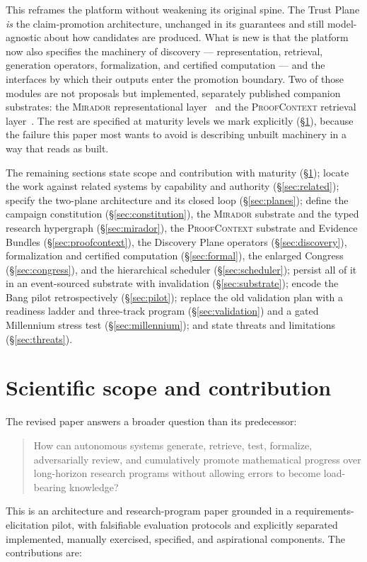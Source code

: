 \documentclass[11pt]{amsart}
\theoremstyle{definition}
\theoremstyle{remark}
\newcommand{\mirador}{\textsc{Mirador}}
\newcommand{\pc}{\textsc{ProofContext}}
\begin{document}
This reframes the platform without weakening its original spine. The Trust Plane
\emph{is} the claim-promotion architecture, unchanged in its guarantees and
still model-agnostic about how candidates are produced. What is new is that the
platform now also specifies the machinery of discovery --- representation,
retrieval, generation operators, formalization, and certified computation ---
and the interfaces by which their outputs enter the promotion boundary. Two of
those modules are not proposals but implemented, separately published companion
substrates: the \mirador{} representational layer~\cite{lucius2026mirador} and
the \pc{} retrieval layer~\cite{lucius2026proofcontext}. The rest are specified
at maturity levels we mark explicitly (\S\ref{sec:scope}), because the failure
this paper most wants to avoid is describing unbuilt machinery in a way that
reads as built.

The remaining sections state scope and contribution with maturity
(\S\ref{sec:scope}); locate the work against related systems by capability and
authority (\S\ref{sec:related}); specify the two-plane architecture and its
closed loop (\S\ref{sec:planes}); define the campaign constitution
(\S\ref{sec:constitution}), the \mirador{} substrate and the typed research
hypergraph (\S\ref{sec:mirador}), the \pc{} substrate and Evidence Bundles
(\S\ref{sec:proofcontext}), the Discovery Plane operators (\S\ref{sec:discovery}),
formalization and certified computation (\S\ref{sec:formal}), the enlarged
Congress (\S\ref{sec:congress}), and the hierarchical scheduler
(\S\ref{sec:scheduler}); persist all of it in an event-sourced substrate with
invalidation (\S\ref{sec:substrate}); encode the Bang pilot retrospectively
(\S\ref{sec:pilot}); replace the old validation plan with a readiness ladder and
three-track program (\S\ref{sec:validation}) and a gated Millennium stress test
(\S\ref{sec:millennium}); and state threats and limitations
(\S\ref{sec:threats}).

\section{Scientific scope and contribution}\label{sec:scope}

The revised paper answers a broader question than its predecessor:
\begin{quote}
How can autonomous systems generate, retrieve, test, formalize, adversarially
review, and cumulatively promote mathematical progress over long-horizon
research programs without allowing errors to become load-bearing knowledge?
\end{quote}
This is an architecture and research-program paper grounded in a
requirements-elicitation pilot, with falsifiable evaluation protocols and
explicitly separated implemented, manually exercised, specified, and aspirational
components. The contributions are:
\end{document}
